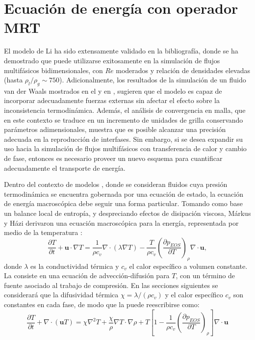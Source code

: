 \section{Ecuaci\'on de energ\'ia con operador MRT}
El modelo \pp{} de Li ha sido extensamente validado en la bibliograf\'ia, donde se ha demostrado que puede utilizarse exitosamente en la simulaci\'on de flujos multif\'asicos bidimensionales, con $Re$ moderados y relaci\'on de densidades elevadas (hasta $\rho_l / \rho_g \sim 750$). Adicionalmente, los resultados de la simulaci\'on de un fluido van der Waals mostrados en el  y en \cite{fogliatto_simulation_2019}, sugieren que el modelo es capaz de incorporar adecuadamente fuerzas externas sin afectar el efecto sobre la inconsistencia termodin\'amica. Adem\'as, el an\'alisis de convergencia en malla, que en este contexto se traduce en un incremento de unidades de grilla conservando par\'ametros adimensionales, muestra que es posible alcanzar una precisi\'on adecuada en la reproducci\'on de interfases. Sin embargo, si se desea expandir su uso hacia la simulaci\'on de flujos multif\'asicos con transferencia de calor y cambio de fase, entonces es necesario proveer un nuevo esquema para cuantificar adecuadamente el transporte de energ\'ia.

Dentro del contexto de modelos \pp{}, donde se consideran fluidos cuya presi\'on termodin\'amica se encuentra gobernada por una ecuaci\'on de estado, la ecuaci\'on de energ\'ia macrosc\'opica debe seguir una forma particular. Tomando como base un balance local de entrop\'ia, y despreciando efectos de disipaci\'on viscosa, M\'arkus y H\'azi derivaron una ecuaci\'on macrosc\'opica para la energ\'ia, representada por medio de la temperatura \cite{markus_simulation_2011}:
\begin{equation}
	\dfrac{\partial T}{\partial t} + \bm{u} \cdot \nabla T = \dfrac{1}{\rho c_v} \nabla \cdot(\lambda \nabla T) - \dfrac{T}{\rho c_v} \left( \dfrac{\partial p_{EOS}}{\partial T} \right)_{\rho} \nabla \cdot \bm{u},
	\label{eq:markus_orig}
\end{equation}
donde $\lambda$ es la conductividad t\'ermica y $c_v$ el calor espec\'ifico a volumen constante. La  consiste en una ecuaci\'on de advecci\'on-difusi\'on para $T$, con un t\'ermino de fuente asociado al trabajo de compresi\'on. En las secciones siguientes se considerar\'a que la difusividad t\'ermica $\chi = \lambda/(\rho c_v)$ y el calor espec\'ifico $c_v$ son constantes en cada fase, de modo que la  puede reescribirse como:
\begin{equation}
	\dfrac{\partial T}{\partial t} + \nabla \cdot (\bm{u} T) = \chi \nabla^2 T  + \dfrac{\chi}{\rho} \nabla T \cdot \nabla \rho + T \left[ 1 - \dfrac{1}{\rho c_v} \left( \dfrac{\partial p_{EOS}}{\partial T} \right)_{\rho} \right] \nabla \cdot \bm{u}
	\label{eq:markus}
\end{equation}

